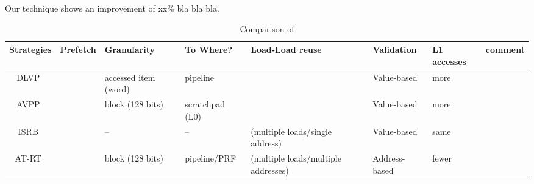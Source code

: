 \documentclass{sig-alternate}
\newcommand{\cmark}{\textcolor{ForestGreen}{\ding{51}}}%
\newcommand{\xmark}{\textcolor{red}{\ding{55}}}%
\begin{document}
Our technique shows an improvement of xx\% bla bla bla.



\begin{scriptsize}
\begin{table}[h!]
  \centering
  \begin{tabular}{|c|p{20mm}|p{20mm}|p{20mm}|p{20mm}|p{20mm}|p{20mm}|p{20mm}|}
    \hline
    \textbf{Strategies} & 
    \textbf{Prefetch} & 
    \textbf{Granularity} & 
    \textbf{To Where?} &
    \textbf{Load-Load reuse} & 
    \textbf{Validation} & 
    \textbf{L1 accesses} & 
    \textbf{comment}\\
    \hline
    
    \hline
    DLVP~\cite{} &  \cmark & accessed \newline item  (word) & pipeline & \xmark &  Value-based &  {\color{red} more} &    \\
    \hline
    AVPP~\cite{} &  \cmark & block \newline (128 bits) & scratchpad \newline (L0)  & \xmark & Value-based &  {\color{red} more} &   \\
    \hline
    ISRB~\cite{} &  \xmark & -- & -- & \cmark (multiple loads/single address) &  Value-based &  {\color{black} same} &    \\
    \hline
    AT-RT~\cite{} &  \cmark & block \newline (128 bits)& pipeline/PRF & \cmark (multiple loads/multiple addresses) &  Address-based & {\color{green} fewer} &    \\
    \hline

    
    \hline
  \end{tabular}
  \caption{Comparison of }
  \label{table:formatting}
\end{table}
\end{scriptsize}
\end{document}
